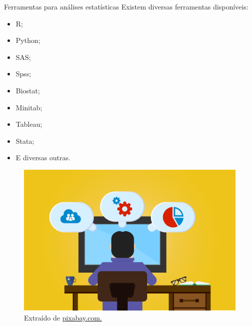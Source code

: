 \documentclass[
  ignorenonframetext,
  serif,
  professionalfont,
  usenames,
  dvipsnames,
  aspectratio = 169]{beamer}
\def\beginAHalfColumn{\begin{minipage}{0.49\textwidth}}%
\def\endColumns{\end{minipage}}%
\begin{document}
\begin{frame}{Ferramentas para análises estatísticas}
\label{ferramentas-para-anuxe1lises-estatuxedsticas}
Existem diversas ferramentas disponíveis:

\beginAHalfColumn

\begin{itemize}
\item
  R;
\item
  Python;
\item
  SAS;
\item
  Spss;
\item
  Biostat;
\item
  Minitab;
\item
  Tableau;
\item
  Stata;
\item
  E diversas outras.
\end{itemize}

\endColumns
\beginAHalfColumn

\begin{figure}

{\centering \includegraphics[width=0.8\linewidth]{./img/programacao} 

}

\caption{Extraído de \href{https://cdn.pixabay.com/photo/2018/06/08/00/48/developer-3461405_960_720.png}{pixabay.com.}}\label{fig:unnamed-chunk-4}
\end{figure}

\endColumns
\end{frame}
\end{document}

